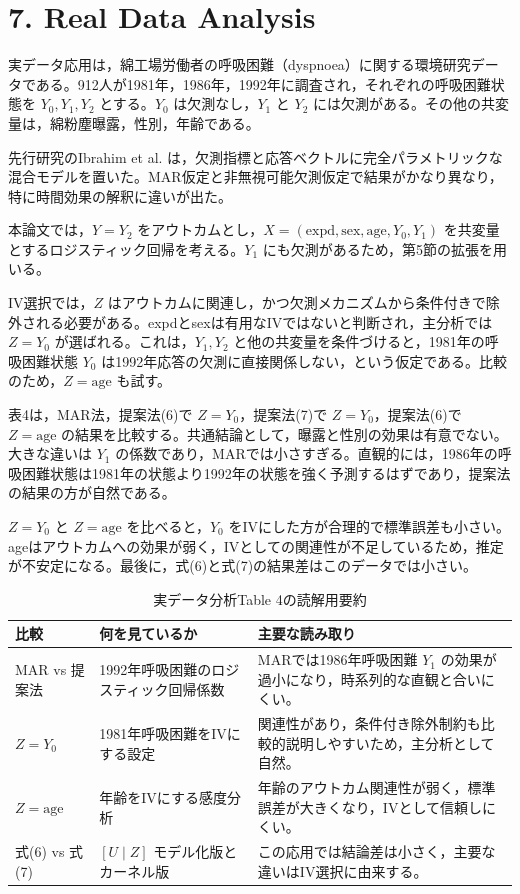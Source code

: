 \documentclass[dvipdfmx,autodetect-engine]{jsarticle}
\begin{document}
\section{7. Real Data Analysis}

実データ応用は，綿工場労働者の呼吸困難（dyspnoea）に関する環境研究データである。912人が1981年，1986年，1992年に調査され，それぞれの呼吸困難状態を $Y_0,Y_1,Y_2$ とする。$Y_0$ は欠測なし，$Y_1$ と $Y_2$ には欠測がある。その他の共変量は，綿粉塵曝露，性別，年齢である。

先行研究のIbrahim et al. は，欠測指標と応答ベクトルに完全パラメトリックな混合モデルを置いた。MAR仮定と非無視可能欠測仮定で結果がかなり異なり，特に時間効果の解釈に違いが出た。

本論文では，$Y=Y_2$ をアウトカムとし，$X=(\text{expd},\text{sex},\text{age},Y_0,Y_1)$ を共変量とするロジスティック回帰を考える。$Y_1$ にも欠測があるため，第5節の拡張を用いる。

IV選択では，$Z$ はアウトカムに関連し，かつ欠測メカニズムから条件付きで除外される必要がある。expdとsexは有用なIVではないと判断され，主分析では $Z=Y_0$ が選ばれる。これは，$Y_1,Y_2$ と他の共変量を条件づけると，1981年の呼吸困難状態 $Y_0$ は1992年応答の欠測に直接関係しない，という仮定である。比較のため，$Z=\text{age}$ も試す。

表4は，MAR法，提案法(6)で $Z=Y_0$，提案法(7)で $Z=Y_0$，提案法(6)で $Z=\text{age}$ の結果を比較する。共通結論として，曝露と性別の効果は有意でない。大きな違いは $Y_1$ の係数であり，MARでは小さすぎる。直観的には，1986年の呼吸困難状態は1981年の状態より1992年の状態を強く予測するはずであり，提案法の結果の方が自然である。

$Z=Y_0$ と $Z=\text{age}$ を比べると，$Y_0$ をIVにした方が合理的で標準誤差も小さい。ageはアウトカムへの効果が弱く，IVとしての関連性が不足しているため，推定が不安定になる。最後に，式(6)と式(7)の結果差はこのデータでは小さい。

\begin{table}[tbp]
\centering
\caption{実データ分析Table 4の読解用要約}
\begin{tabular}{p{.24\linewidth}p{.32\linewidth}p{.34\linewidth}}
\hline
比較 & 何を見ているか & 主要な読み取り \\
\hline
MAR vs 提案法 & 1992年呼吸困難のロジスティック回帰係数 & MARでは1986年呼吸困難 $Y_1$ の効果が過小になり，時系列的な直観と合いにくい。\\
$Z=Y_0$ & 1981年呼吸困難をIVにする設定 & 関連性があり，条件付き除外制約も比較的説明しやすいため，主分析として自然。\\
$Z=\text{age}$ & 年齢をIVにする感度分析 & 年齢のアウトカム関連性が弱く，標準誤差が大きくなり，IVとして信頼しにくい。\\
式(6) vs 式(7) & $[U\mid Z]$ モデル化版とカーネル版 & この応用では結論差は小さく，主要な違いはIV選択に由来する。\\
\hline
\end{tabular}
\end{table}
\end{document}

